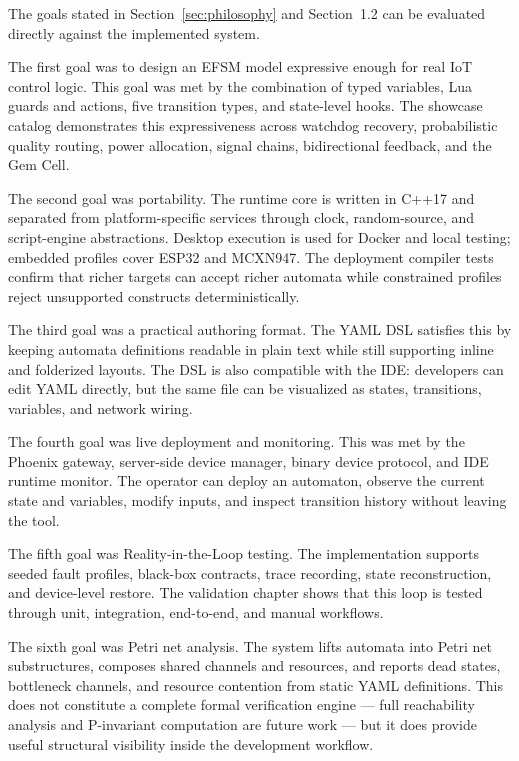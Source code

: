 The goals stated in Section~\ref{sec:philosophy} and Section~1.2 can be evaluated directly against the implemented system.

The first goal was to design an EFSM model expressive enough for real IoT control logic. This goal was met by the combination of typed variables, Lua guards and actions, five transition types, and state-level hooks. The showcase catalog demonstrates this expressiveness across watchdog recovery, probabilistic quality routing, power allocation, signal chains, bidirectional feedback, and the Gem Cell.

The second goal was portability. The runtime core is written in C++17 and separated from platform-specific services through clock, random-source, and script-engine abstractions. Desktop execution is used for Docker and local testing; embedded profiles cover ESP32 and MCXN947. The deployment compiler tests confirm that richer targets can accept richer automata while constrained profiles reject unsupported constructs deterministically.

The third goal was a practical authoring format. The YAML DSL satisfies this by keeping automata definitions readable in plain text while still supporting inline and folderized layouts. The DSL is also compatible with the IDE: developers can edit YAML directly, but the same file can be visualized as states, transitions, variables, and network wiring.

The fourth goal was live deployment and monitoring. This was met by the Phoenix gateway, server-side device manager, binary device protocol, and IDE runtime monitor. The operator can deploy an automaton, observe the current state and variables, modify inputs, and inspect transition history without leaving the tool.

The fifth goal was Reality-in-the-Loop testing. The implementation supports seeded fault profiles, black-box contracts, trace recording, state reconstruction, and device-level restore. The validation chapter shows that this loop is tested through unit, integration, end-to-end, and manual workflows.

The sixth goal was Petri net analysis. The system lifts automata into Petri net substructures, composes shared channels and resources, and reports dead states, bottleneck channels, and resource contention from static YAML definitions. This does not constitute a complete formal verification engine --- full reachability analysis and P-invariant computation are future work --- but it does provide useful structural visibility inside the development workflow.

